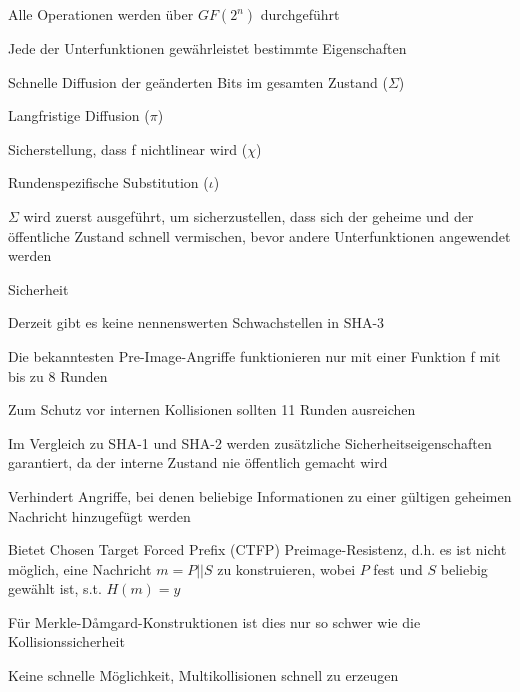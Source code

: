 \documentclass[a4paper]{article}
\begin{document}
\begin{multicols}{3}
\begin{itemize*}
\begin{itemize*}
                  \item Alle Operationen werden über $GF(2^n)$ durchgeführt
                  \item Jede der Unterfunktionen gewährleistet bestimmte Eigenschaften
                  \begin{itemize*}
                        \item Schnelle Diffusion der geänderten Bits im gesamten Zustand ($\Sigma$)
                        \item Langfristige Diffusion ($\pi$)
                        \item Sicherstellung, dass f nichtlinear wird ($\chi$)
                        \item Rundenspezifische Substitution ($\iota$)
                  \end{itemize*}
            \end{itemize*}
            \item $\Sigma$ wird zuerst ausgeführt, um sicherzustellen, dass sich der geheime und der öffentliche Zustand schnell vermischen, bevor andere Unterfunktionen angewendet werden
            \item Sicherheit
            \begin{itemize*}
                  \item Derzeit gibt es keine nennenswerten Schwachstellen in SHA-3
                  \item Die bekanntesten Pre-Image-Angriffe funktionieren nur mit einer Funktion f mit bis zu 8 Runden
                  \item Zum Schutz vor internen Kollisionen sollten 11 Runden ausreichen
                  \item Im Vergleich zu SHA-1 und SHA-2 werden zusätzliche Sicherheitseigenschaften garantiert, da der interne Zustand nie öffentlich gemacht wird
                  \item Verhindert Angriffe, bei denen beliebige Informationen zu einer gültigen geheimen Nachricht hinzugefügt werden
                  \item Bietet Chosen Target Forced Prefix (CTFP) Preimage-Resistenz, d.h. es ist nicht möglich, eine Nachricht $m=P||S$ zu konstruieren, wobei $P$ fest und $S$ beliebig gewählt ist, s.t. $H(m)=y$
                  \item Für Merkle-Dåmgard-Konstruktionen ist dies nur so schwer wie die Kollisionssicherheit
                  \item Keine schnelle Möglichkeit, Multikollisionen schnell zu erzeugen
            \end{itemize*}
      \end{itemize*}


\end{multicols}
\end{document}
